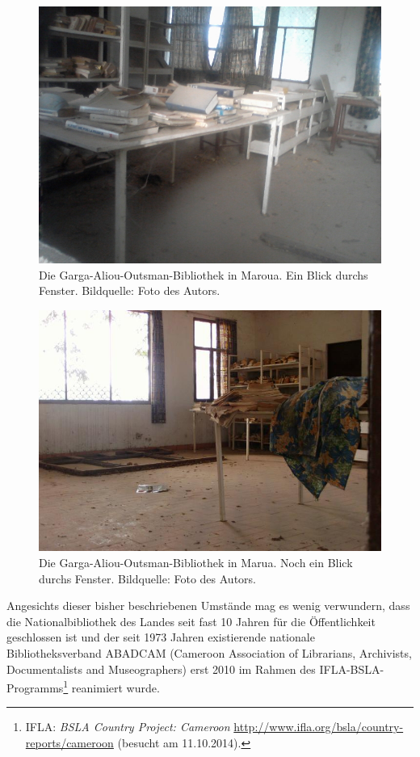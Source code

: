 \documentclass[a4paper,
fontsize=11pt,
oneside,
numbers=noperiodatend,
parskip=half-,
bibliography=totoc,
final
]{scrartcl}
\begin{document}
\begin{figure}[htbp]
\centering
\includegraphics{img/Maroua1.jpg}
\caption{Die Garga-Aliou-Outsman-Bibliothek in Maroua. Ein Blick durchs
Fenster. Bildquelle: Foto des Autors.}
\end{figure}

\begin{figure}[htbp]
\centering
\includegraphics{img/Maroua3.jpg}
\caption{Die Garga-Aliou-Outsman-Bibliothek in Marua. Noch ein Blick
durchs Fenster. Bildquelle: Foto des Autors.}
\end{figure}

Angesichts dieser bisher beschriebenen Umstände mag es wenig verwundern,
dass die Nationalbibliothek des Landes seit fast 10 Jahren für die
Öffentlichkeit geschlossen ist und der seit 1973 Jahren existierende
nationale Bibliotheksverband ABADCAM (Cameroon Association of
Librarians, Archivists, Documentalists and Museographers) erst 2010 im
Rahmen des IFLA-BSLA-Programms\footnote{IFLA: \emph{BSLA Country
  Project: Cameroon}
  \url{http://www.ifla.org/bsla/country-reports/cameroon} (besucht am
  11.10.2014).} reanimiert wurde.
\end{document}
